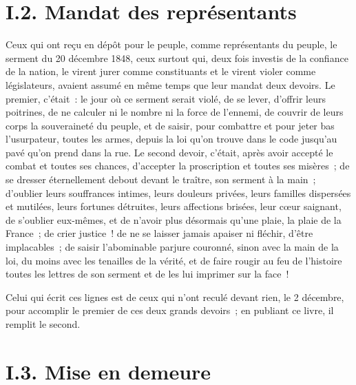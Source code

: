 \documentclass[french,twoside]{book} %
\begin{document}
\section[{I.2. Mandat des représentants}]{I.2. Mandat des représentants}

\noindent Ceux qui ont reçu en dépôt pour le peuple, comme représentants du peuple, le serment du 20 décembre 1848, ceux surtout qui, deux fois investis de la confiance de la nation, le virent jurer comme constituants et le virent violer comme législateurs, avaient assumé en même temps que leur mandat deux devoirs. Le premier, c’était : le jour où ce serment serait violé, de se lever, d’offrir leurs poitrines, de ne calculer ni le nombre ni la force de l’ennemi, de couvrir de leurs corps la souveraineté du peuple, et de saisir, pour combattre et pour jeter bas l’usurpateur, toutes les armes, depuis la loi qu’on trouve dans le code jusqu’au pavé qu’on prend dans la rue. Le second devoir, c’était, après avoir accepté le combat et toutes ses chances, d’accepter la proscription et toutes ses misères ; de se dresser éternellement debout devant le traître, son serment à la main ; d’oublier leurs souffrances intimes, leurs douleurs privées, leurs familles dispersées et mutilées, leurs fortunes détruites, leurs affections brisées, leur cœur saignant, de s’oublier eux-mêmes, et de n’avoir plus désormais qu’une plaie, la plaie de la France ; de crier justice ! de ne se laisser jamais apaiser ni fléchir, d’être implacables ; de saisir l’abominable parjure couronné, sinon avec la main de la loi, du moins avec les tenailles de la vérité, et de faire rougir au feu de l’histoire toutes les lettres de son serment et de les lui imprimer sur la face !\par
Celui qui écrit ces lignes est de ceux qui n’ont reculé devant rien, le 2 décembre, pour accomplir le premier de ces deux grands devoirs ; en publiant ce livre, il remplit le second.

\section[{I.3. Mise en demeure}]{I.3. Mise en demeure}
\end{document}
